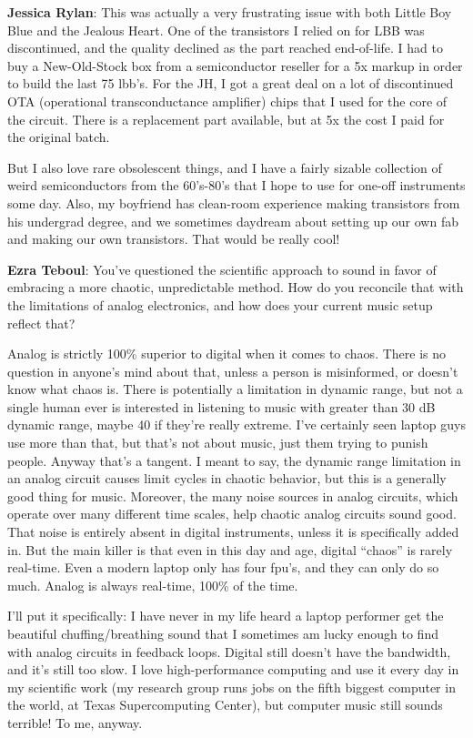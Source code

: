 \textbf{Jessica Rylan}: This was actually a very frustrating issue with both Little Boy Blue and the Jealous Heart. One of the transistors I relied on for LBB was discontinued, and the quality declined as the part reached end-of-life. I had to buy a New-Old-Stock box from a semiconductor reseller for a 5x markup in order to build the last 75 lbb's. For the JH, I got a great deal on a lot of discontinued OTA (operational transconductance amplifier) chips that I used for the core of the circuit. There is a replacement part available, but at 5x the cost I paid for the original batch.

But I also love rare obsolescent things, and I have a fairly sizable collection of weird semiconductors from the 60's-80's that I hope to use for one-off instruments some day. Also, my boyfriend has clean-room experience making transistors from his undergrad degree, and we sometimes daydream about setting up our own fab and making our own transistors. That would be really cool!

\textbf{Ezra Teboul}: You've questioned the scientific approach to sound in favor of embracing a more chaotic, unpredictable method. How do you reconcile that with the limitations of analog electronics, and how does your current music setup reflect that? 

Analog is strictly 100\% superior to digital when it comes to chaos. There is no question in anyone's mind about that, unless a person is misinformed, or doesn't know
what chaos is. There is potentially a limitation in dynamic range, but not a single
human ever is interested in listening to music with greater than 30 dB dynamic range,
maybe 40 if they're really extreme. I've certainly seen laptop guys use more than that,
but that's not about music, just them trying to punish people. Anyway that's a tangent. I meant to say, the dynamic range limitation in an analog circuit causes limit cycles
in chaotic behavior, but this is a generally good thing for music. Moreover, the many
noise sources in analog circuits, which operate over many different time scales, help
chaotic analog circuits sound good. That noise is entirely absent in digital
instruments, unless it is specifically added in. But the main killer is that even in
this day and age, digital ``chaos'' is rarely real-time. Even a modern laptop only has
four fpu's, and they can only do so much. Analog is always real-time, 100\% of the time.


I'll put it specifically: I have never in my life heard a laptop performer get the beautiful chuffing/breathing sound that I sometimes am lucky enough to find with analog circuits in feedback loops. Digital still doesn't have the bandwidth, and it's still too slow. I love high-performance computing and use it every day in my scientific work (my research group runs jobs on the fifth biggest computer in the world, at Texas Supercomputing Center), but computer music still sounds terrible! To me, anyway.

